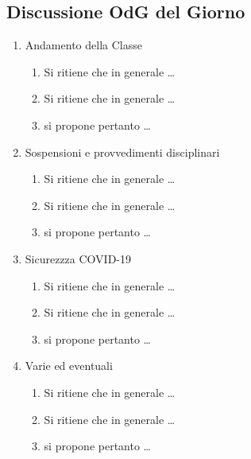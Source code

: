 \documentclass[11pt, a4paper]{exam}
\begin{document}
\subsection*{Discussione OdG del Giorno}
\begin{enumerate}
	\item Andamento della Classe
	
	\begin{enumerate}
		\item Si ritiene che in generale \dots
		\item Si ritiene che in generale \dots
		\item si propone pertanto \dots
	\end{enumerate}
	
	\item Sospensioni e provvedimenti disciplinari
		\begin{enumerate}
		\item Si ritiene che in generale \dots
		\item Si ritiene che in generale \dots
		\item si propone pertanto \dots
	\end{enumerate}
	
	\item Sicurezzza COVID-19
		\begin{enumerate}
		\item Si ritiene che in generale \dots
		\item Si ritiene che in generale \dots
		\item si propone pertanto \dots
	\end{enumerate}
	
	\item Varie ed eventuali
		\begin{enumerate}
		\item Si ritiene che in generale \dots
		\item Si ritiene che in generale \dots
		\item si propone pertanto \dots
	\end{enumerate}
	
\end{enumerate}


\vspace{12pt}
\par\noindent\dotfill{}\\[12pt]
\end{document}
